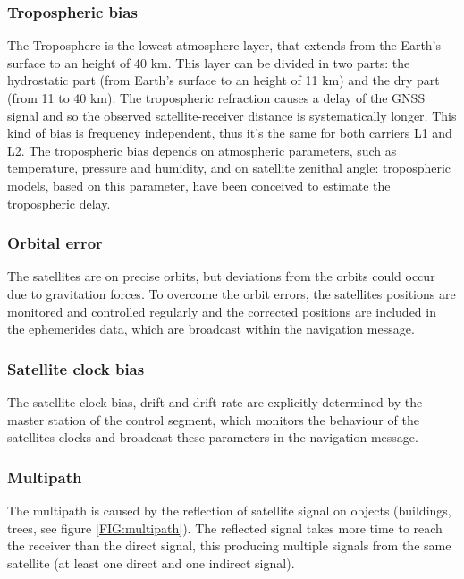 \subsubsection{Tropospheric bias}
The Troposphere is the lowest atmosphere layer, that extends from the Earth's surface to an height of 40 km. This layer can be divided in two parts: the hydrostatic part (from Earth's surface to an height of 11 km) and the dry part (from 11 to 40 km). The tropospheric refraction causes a delay of the GNSS signal and so the observed satellite-receiver distance is systematically longer. This kind of bias is frequency independent, thus it's the same for both carriers L1 and L2. The tropospheric bias depends on atmospheric parameters, such as temperature, pressure and humidity, and on satellite zenithal angle: tropospheric models, based on this parameter, have been conceived to estimate the tropospheric delay.

\subsubsection{Orbital error}

The satellites are on precise orbits, but deviations from the orbits could occur due to gravitation forces. To overcome the orbit errors, the satellites positions are monitored and controlled regularly and the corrected positions are included in the ephemerides data, which are broadcast
within the navigation message.

\subsubsection{Satellite clock bias}

The satellite clock bias, drift and drift-rate are explicitly determined by the master station of the control segment, which monitors the behaviour of the satellites clocks and broadcast these parameters in the navigation message.

\subsubsection{Multipath}

The multipath is caused by the reflection of satellite signal on objects (buildings, trees, see figure \ref{FIG:multipath}). The reflected signal takes more time to reach the receiver than the direct signal, this producing multiple signals from the same satellite (at least one direct and one indirect signal).


